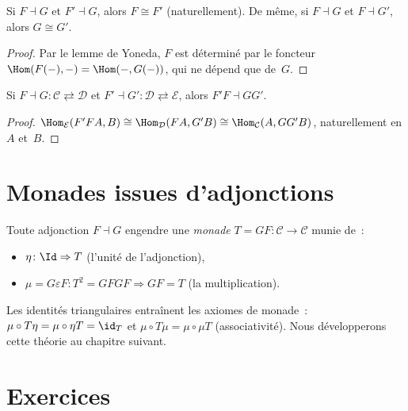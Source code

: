 \begin{proposition}\label{prop:unicite-adjoints}
Si $F\dashv G$ et $F'\dashv G$, alors $F\cong F'$ (naturellement).
De même, si $F\dashv G$ et $F\dashv G'$, alors $G\cong G'$.
\end{proposition}

\begin{proof}
Par le lemme de Yoneda, $F$ est déterminé par le foncteur
$\Hom(F(-),-)=\Hom(-,G(-))$, qui ne dépend que de~$G$.
\end{proof}

\begin{proposition}\label{prop:composition-adj}
Si $F\dashv G\colon\mathcal{C}\rightleftarrows\mathcal{D}$ et
$F'\dashv G'\colon\mathcal{D}\rightleftarrows\mathcal{E}$, alors
$F'F\dashv GG'$.
\end{proposition}

\begin{proof}
$\Hom_\mathcal{E}(F'FA,B)
\cong\Hom_\mathcal{D}(FA,G'B)
\cong\Hom_\mathcal{C}(A,GG'B)$,
naturellement en $A$ et~$B$.
\end{proof}


\section{Monades issues d'adjonctions}\label{sec:monades-apercu}

\begin{remarque}\label{rem:monade-apercu}
Toute adjonction $F\dashv G$ engendre une \emph{monade}
$T = GF\colon\mathcal{C}\to\mathcal{C}$ munie de~:
\begin{itemize}
\item $\eta\colon\Id\Rightarrow T$ (l'unité de l'adjonction),
\item $\mu = G\varepsilon F\colon T^2 = GFGF\Rightarrow GF = T$
      (la multiplication).
\end{itemize}
Les identités triangulaires entraînent les axiomes de monade~:
$\mu\circ T\eta = \mu\circ\eta T = \id_T$ et
$\mu\circ T\mu = \mu\circ\mu T$ (associativité).
Nous développerons cette théorie au chapitre suivant.
\end{remarque}


\section{Exercices}\label{sec:exo-adjonctions}

